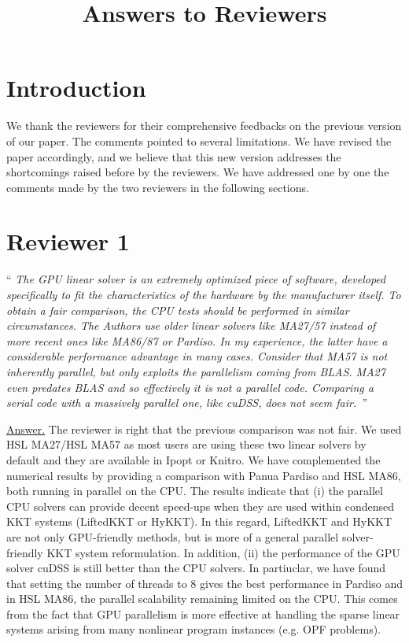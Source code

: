 \documentclass[10pt,a4paper]{article}
\newenvironment{quotereviewer}{\vspace{.5cm}{\underline\reviewername} ``\it\footnotesize}{''}
\newcommand{\answer}{\vspace{1mm}\underline{Answer.} }
\begin{document}
\title{\textbf{Answers to Reviewers}\\
}
\maketitle

\section*{Introduction}
We thank the reviewers for their comprehensive feedbacks on the previous
version of our paper. The comments pointed to several limitations.
We have revised the paper accordingly, and we believe that this new version addresses
the shortcomings raised before by the reviewers.
We have addressed one by one the comments made by the two reviewers in
the following sections.

\section{Reviewer 1}
\def\reviewername{Reviewer~\#1}
\bigskip

\begin{quotereviewer}
The GPU linear solver is an extremely optimized piece of software, developed specifically to fit the characteristics of the hardware by the manufacturer itself. To obtain a fair comparison, the CPU tests should be performed in similar circumstances.
The Authors use older linear solvers like MA27/57 instead of more recent ones like MA86/87 or Pardiso. In my experience, the latter have a considerable performance advantage in many cases. Consider that MA57 is not inherently parallel, but only exploits the parallelism coming from BLAS. MA27 even predates BLAS and so effectively it is not a parallel code. Comparing a serial code with a massively parallel one, like cuDSS, does not seem fair.
\end{quotereviewer}

\answer
The reviewer is right that the previous comparison was not fair. We used HSL MA27/HSL MA57 as most
users are using these two linear solvers by default and they are available in Ipopt or Knitro.
We have complemented the numerical results by providing a comparison with Panua Pardiso and HSL MA86, both running in parallel on the CPU.
The results indicate that
(i) the parallel CPU solvers can provide decent speed-ups when they are used within condensed KKT systems (LiftedKKT or HyKKT).
In this regard, LiftedKKT and HyKKT are not only GPU-friendly methods, but is more of a general parallel solver-friendly KKT system reformulation.
In addition, (ii) the performance of the GPU solver cuDSS is still better than the CPU solvers.
In partiuclar, we have found that setting the number of threads to 8 gives the best performance in Pardiso and in HSL MA86, the parallel
scalability remaining limited on the CPU.
This comes from the fact that GPU parallelism is more effective at handling the sparse linear systems arising from many nonlinear program instances (e.g. OPF problems).
\end{document}

